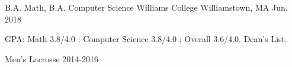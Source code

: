 

\begin{cventries}

\begin{cventry}
  {B.A. Math, B.A. Computer Science} %
  {Williams College} %
  {Williamstown, MA} %
  {Jun. 2018} %
  {
    \begin{cvitems} %
      \item {GPA: Math 3.8/4.0 ; Computer Science 3.8/4.0 ; Overall 3.6/4.0. Dean's List.}
      \item {Men's Lacrosse 2014-2016}
    \end{cvitems}
  }
\end{cventry}

\end{cventries}
